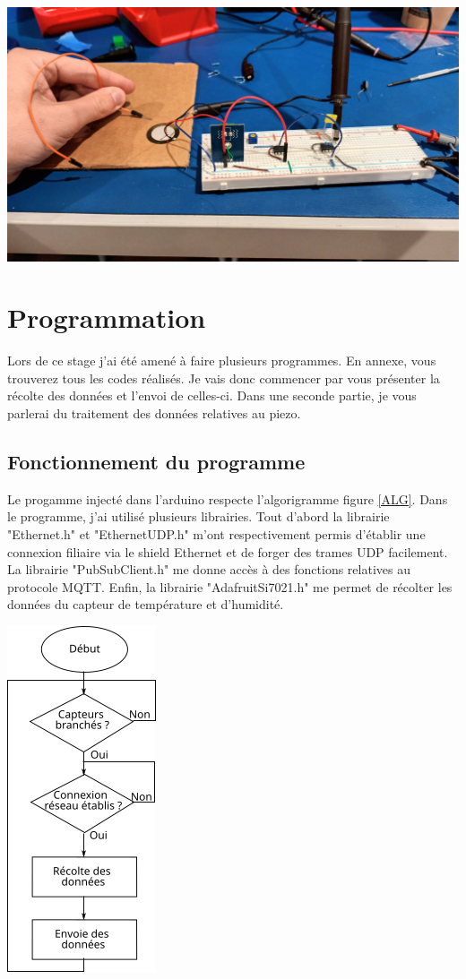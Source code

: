 \documentclass[12pt,french,a4paper]{article}
\begin{document}
\begin{center}	
\includegraphics[scale=0.1]{../img/froty.jpg}
\label{M}
\end{center}

\newpage
\section{Programmation}
Lors de ce stage j'ai été amené à faire plusieurs programmes. En annexe, vous trouverez tous les codes réalisés. Je vais donc commencer par vous présenter la récolte des données et l'envoi de celles-ci. Dans une seconde partie, je vous parlerai du traitement des données relatives au piezo. 

\subsection{Fonctionnement du programme}
Le progamme injecté dans l'arduino respecte l'algorigramme figure \ref{ALG}. Dans le programme, j'ai utilisé plusieurs librairies. Tout d'abord la librairie "Ethernet.h" et "EthernetUDP.h"  m'ont respectivement permis d'établir une connexion filiaire via le shield Ethernet et de forger des trames UDP facilement. La librairie "PubSubClient.h" me donne accès à des fonctions relatives au protocole MQTT. Enfin, la librairie "AdafruitSi7021.h" me permet de récolter les données du capteur de température et d'humidité.  
\begin{center}	
\includegraphics[scale=1]{../img/algorigrame.png}
\label{ALG}
\end{center}
\end{document}
